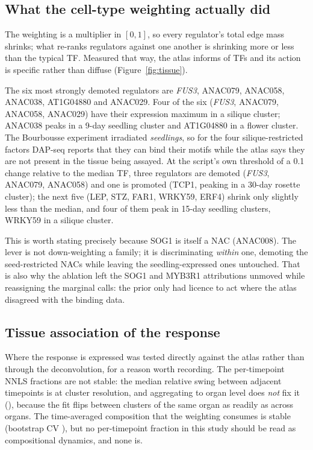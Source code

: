 \subsection{What the cell-type weighting actually did}

The weighting is a multiplier in $[0,1]$, so every regulator's total edge mass shrinks;
what re-ranks regulators against one another is shrinking more or less than the typical
TF. Measured that way, the atlas informs \NumTFsAtlasInformed{} of \NumTFsTotal{} TFs and
its action is specific rather than diffuse (Figure~\ref{fig:tissue}).

The six most strongly demoted regulators are \textit{FUS3}, ANAC079, ANAC058, ANAC038,
AT1G04880 and ANAC029. Four of the six (\textit{FUS3}, ANAC079, ANAC058, ANAC029) have their
expression maximum in a silique cluster; ANAC038 peaks in a 9-day seedling cluster and
AT1G04880 in a flower cluster. The Bourbousse experiment irradiated \emph{seedlings}, so for
the four silique-restricted factors DAP-seq reports that they can bind their motifs while
the atlas says they are not present in the tissue being assayed. At the script's own
threshold of a 0.1 change relative to the median TF, three regulators are demoted
(\textit{FUS3}, ANAC079, ANAC058) and one is promoted (TCP1, peaking in a 30-day rosette
cluster); the next five (LEP, STZ, FAR1, WRKY59, ERF4) shrink only slightly less than the
median, and four of them peak in 15-day seedling clusters, WRKY59 in a silique cluster.

This is worth stating precisely because SOG1 is itself a NAC (ANAC008). The lever is not
down-weighting a family; it is discriminating \emph{within} one, demoting the seed-restricted
NACs while leaving the seedling-expressed ones untouched. That is also why the ablation
left the SOG1 and MYB3R1 attributions unmoved while reassigning the marginal calls: the
prior only had licence to act where the atlas disagreed with the binding data.

\subsection{Tissue association of the response}

Where the response is expressed was tested directly against the atlas rather than through
the deconvolution, for a reason worth recording. The per-timepoint NNLS fractions are not
stable: the median relative swing between adjacent timepoints is \ClusterSwing{} at cluster
resolution, and aggregating to organ level does \emph{not} fix it (\OrganSwing{}), because
the fit flips between clusters of the same organ as readily as across organs. The
time-averaged composition that the weighting consumes is stable (bootstrap CV
\TimeAveragedCV{}), but no per-timepoint fraction in this study should be read as
compositional dynamics, and none is.

